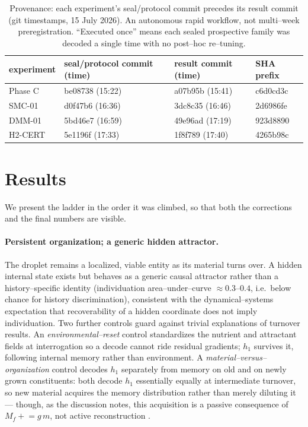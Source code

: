 \documentclass[11pt]{article}
\begin{document}
\begin{table}[t]\centering\small
\caption{Provenance: each experiment's seal/protocol commit precedes its result commit (git timestamps, 15 July 2026). An autonomous rapid workflow, not multi--week preregistration. ``Executed once'' means each sealed prospective family was decoded a single time with no post--hoc re--tuning.}
\label{tab:provenance}
\begin{tabular}{@{}llll@{}}\toprule
experiment & seal/protocol commit (time) & result commit (time) & SHA prefix\\\midrule
Phase C & be08738 (15:22) & a07b95b (15:41) & c6d0cd3c\\
SMC-01 & d0f47b6 (16:36) & 3dc8c35 (16:46) & 2d6986fe\\
DMM-01 & 5bd46e7 (16:59) & 49e96ad (17:19) & 923d8890\\
H2-CERT & 5e1196f (17:33) & 1f8f789 (17:40) & 4265b98c\\\bottomrule
\end{tabular}
\end{table}

\section{Results}
\label{sec:results}
We present the ladder in the order it was climbed, so that both the corrections and the final numbers are visible.

\paragraph{Persistent organization; a generic hidden attractor.} The droplet remains a localized, viable entity as
its material turns over. A hidden internal state exists but behaves as a generic causal attractor rather than a
history--specific identity (individuation area--under--curve $\approx0.3$--$0.4$, i.e.\ below chance for
history discrimination), consistent with the dynamical--systems expectation that recoverability of a hidden
coordinate does not imply individuation. Two further controls guard against trivial explanations of turnover results. An \emph{environmental--reset} control standardizes the nutrient and attractant fields at interrogation so a decode cannot ride residual gradients; $h_1$ survives it, following internal memory rather than environment. A \emph{material--versus--organization} control decodes $h_1$ separately from memory on old and on newly grown constituents: both decode $h_1$ essentially equally at intermediate turnover, so new material acquires the memory distribution rather than merely diluting it --- though, as the discussion notes, this acquisition is a passive consequence of $M_f\mathrel{+}=g\,m$, not active reconstruction \citep{hopfield1982,hermann1977}.
\end{document}
